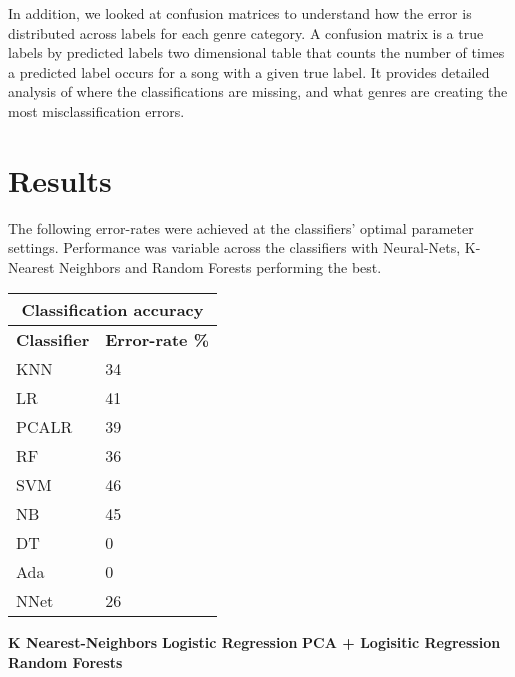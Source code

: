 \documentclass{article} %
\begin{document}
In addition, we looked at confusion matrices to understand how the error is distributed across labels for each genre category. A confusion matrix is a true labels by predicted labels two dimensional table that counts the number of times a predicted label occurs for a song with a given true label. It provides detailed analysis of where the classifications are missing, and what genres are creating the most misclassification errors.

\section{Results}
The following error-rates were achieved at the classifiers' optimal parameter settings. Performance was variable across the classifiers with Neural-Nets, K-Nearest Neighbors and Random Forests performing the best. \newline
\vspace{5mm}
\vspace{5mm}
\begin{tabular}{ |p{2cm}|p{2.3cm}|}
\hline
\multicolumn{2}{|c|}{\textbf{Classification accuracy}} \\
\hline
\textbf{Classifier} & \textbf{Error-rate \%} \\
\hline
KNN & 34 \\
LR & 41  \\
PCALR & 39 \\
RF    &  36 \\
SVM & 46 \\
NB & 45 \\
DT & 0 \\
Ada & 0 \\
NNet & 26 \\
\hline
\end{tabular}
\textbf{K Nearest-Neighbors}  
\vspace{5mm}
\vspace{5mm}
\textbf{Logistic Regression}
\vspace{5mm}
\vspace{5mm}
\textbf{PCA + Logisitic Regression} 
\vspace{5mm}
\vspace{5mm}
\textbf{Random Forests}
\vspace{5mm}
\vspace{5mm}
\end{document}
